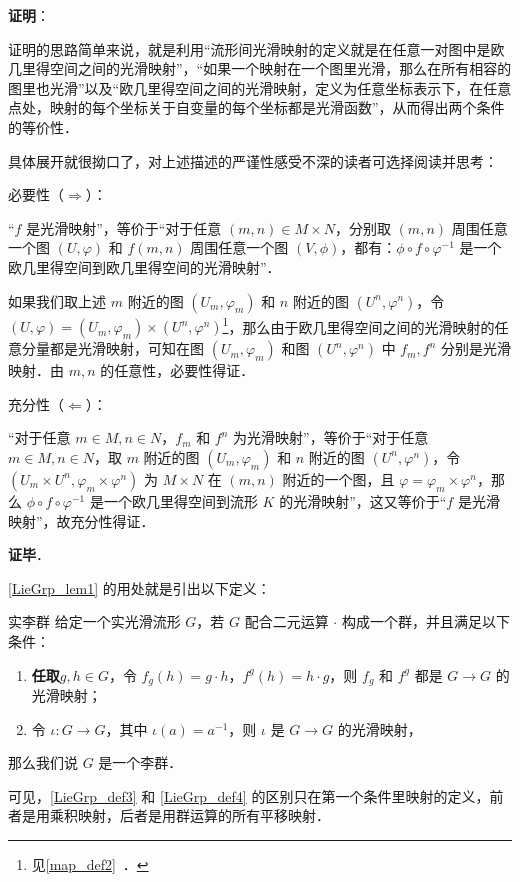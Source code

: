 \textbf{证明}：

证明的思路简单来说，就是利用“流形间光滑映射的定义就是在任意一对图中是欧几里得空间之间的光滑映射”，“如果一个映射在一个图里光滑，那么在所有相容的图里也光滑”以及“欧几里得空间之间的光滑映射，定义为任意坐标表示下，在任意点处，映射的每个坐标关于自变量的每个坐标都是光滑函数”，从而得出两个条件的等价性．

具体展开就很拗口了，对上述描述的严谨性感受不深的读者可选择阅读并思考：

必要性（$\Rightarrow$）：

“$f$ 是光滑映射”，等价于“对于任意 $(m, n)\in M\times N$，分别取 $(m, n)$ 周围任意一个图 $(U, \varphi)$ 和 $f(m, n)$ 周围任意一个图 $(V, \phi)$，都有：$\phi\circ f\circ\varphi^{-1}$ 是一个欧几里得空间到欧几里得空间的光滑映射”．

如果我们取上述 $m$ 附近的图 $(U_m, \varphi_m)$ 和 $n$ 附近的图 $(U^n, \varphi^n)$，令 $(U, \varphi)=(U_m, \varphi_m)\times(U^n, \varphi^n)$\footnote{见\autoref{map_def2}~．}，那么由于欧几里得空间之间的光滑映射的任意分量都是光滑映射，可知在图 $(U_m, \varphi_m)$ 和图 $(U^n, \varphi^n)$ 中 $f_m, f^n$ 分别是光滑映射．由 $m, n$ 的任意性，必要性得证．

充分性（$\Leftarrow$）：

“对于任意 $m\in M, n\in N$，$f_m$ 和 $f^n$ 为光滑映射”，等价于“对于任意 $m\in M, n\in N$，取 $m$ 附近的图 $(U_m, \varphi_m)$ 和 $n$ 附近的图 $(U^n, \varphi^n)$，令 $(U_m\times U^n, \varphi_m\times\varphi^n)$ 为 $M\times N$ 在 $(m, n)$ 附近的一个图，且 $\varphi=\varphi_m\times\varphi^n$，那么 $\phi\circ f\circ\varphi^{-1}$ 是一个欧几里得空间到流形 $K$ 的光滑映射”，这又等价于“$f$ 是光滑映射”，故充分性得证．

\textbf{证毕}．

\autoref{LieGrp_lem1} 的用处就是引出以下定义：

\begin{definition}{实李群}\label{LieGrp_def4}
给定一个实光滑流形 $G$，若 $G$ 配合二元运算 $\cdot$ 构成一个群，并且满足以下条件：
\begin{enumerate}
\item \textbf{任取}$g, h\in G$，令 $f_g(h)=g\cdot h$，$f^g(h)=h\cdot g$，则 $f_g$ 和 $f^g$ 都是 $G\to G$ 的光滑映射；
\item 令 $\iota:G\to G$，其中 $\iota(a)=a^{-1}$，则 $\iota$ 是 $G\to G$ 的光滑映射，
\end{enumerate}
那么我们说 $G$ 是一个李群．
\end{definition}

可见，\autoref{LieGrp_def3} 和 \autoref{LieGrp_def4} 的区别只在第一个条件里映射的定义，前者是用乘积映射，后者是用群运算的所有平移映射．

